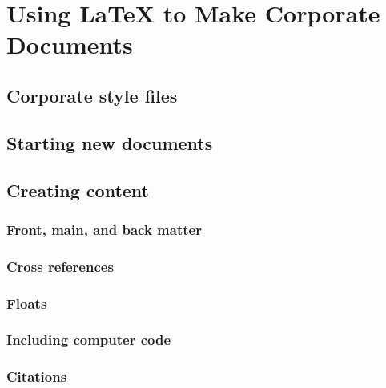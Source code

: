 \section{Using LaTeX to Make Corporate Documents }


\subsection{Corporate style files}\label{sec:Corporatecls}


\subsection{Starting new documents}\label{sec:NewDocs}


\subsection{Creating content}
\subsubsection{Front, main, and back matter}


\subsubsection{Cross references}


\subsubsection{Floats}


\subsubsection{Including computer code}\label{Sec:Codes}


\subsubsection{Citations}\label{Sec:Citations}


